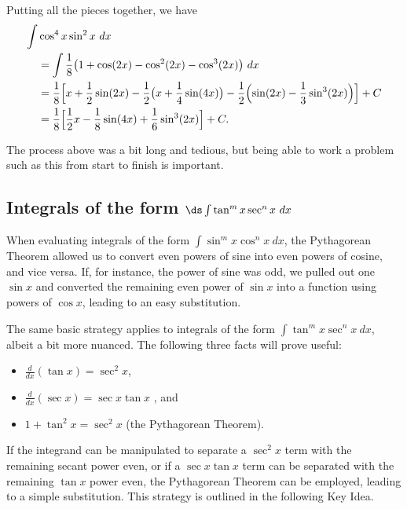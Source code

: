 \begin{example}
Putting all the pieces together, we have
\begin{align*}
	\int &\cos^4x\sin^2x\ dx \\
	&=\int \frac18\bigl(1+\cos(2x)-\cos^2(2x)-\cos^3(2x)\bigr)\ dx \\
	&= \frac18
	\Bigl[x+\frac12\sin(2x)-\frac12\bigl(x+\frac14\sin(4x)\bigr)
	-\frac12\Bigl(\sin(2x)-\frac13\sin^3(2x)\Bigr)\Bigr]
	+C \\
	&=\frac18\Bigl[\frac12x-\frac18\sin(4x)+\frac16\sin^3(2x)\Bigr]+C.
\end{align*}
\end{example}

The process above was a bit long and tedious, but being able to work a problem such as this from start to finish is important.

\subsection{\texorpdfstring{Integrals of the form $\ds\int\tan^mx\sec^nx\ dx$}{Integrands of the form (tan x)\^{}m (sec x)\^{}n}}

When evaluating integrals of the form $\int \sin^mx\cos^nx\ dx$, the Pythagorean Theorem allowed us to convert even powers of sine into even powers of cosine, and vice versa. If, for instance, the power of sine was odd, we pulled out one $\sin x$ and converted the remaining even power of $\sin x$ into a function using powers of $\cos x$, leading to an easy substitution.

The same basic strategy applies to integrals of the form $\int \tan^mx\sec^n x\ dx$, albeit a bit more nuanced. The following three facts will prove useful:
\begin{itemize}
\item $\frac{d}{dx}(\tan x) = \sec^2x$, 
\item $\frac{d}{dx}(\sec x) = \sec x\tan x$ , and 
\item	$1+\tan^2x = \sec^2x$ (the Pythagorean Theorem).
\end{itemize}

If the integrand can be manipulated to separate a $\sec^2x$ term with the remaining secant power even, or if a $\sec x\tan x$ term can be separated with the remaining $\tan x$ power even, the Pythagorean Theorem can be employed, leading to a simple substitution. This strategy is outlined in the following Key Idea.

